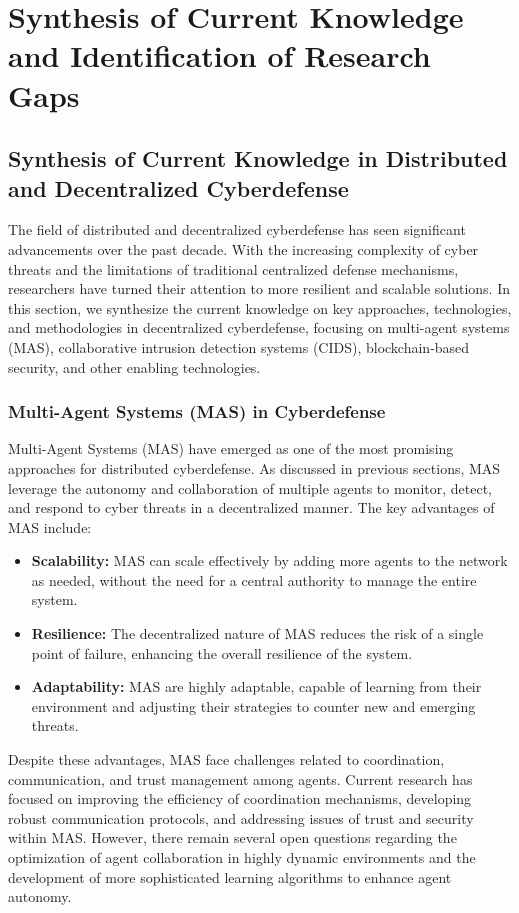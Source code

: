 \section{Synthesis of Current Knowledge and Identification of Research Gaps}

\subsection{Synthesis of Current Knowledge in Distributed and Decentralized Cyberdefense}

The field of distributed and decentralized cyberdefense has seen significant advancements over the past decade. With the increasing complexity of cyber threats and the limitations of traditional centralized defense mechanisms, researchers have turned their attention to more resilient and scalable solutions. In this section, we synthesize the current knowledge on key approaches, technologies, and methodologies in decentralized cyberdefense, focusing on multi-agent systems (MAS), collaborative intrusion detection systems (CIDS), blockchain-based security, and other enabling technologies.

\subsubsection{Multi-Agent Systems (MAS) in Cyberdefense}

Multi-Agent Systems (MAS) have emerged as one of the most promising approaches for distributed cyberdefense. As discussed in previous sections, MAS leverage the autonomy and collaboration of multiple agents to monitor, detect, and respond to cyber threats in a decentralized manner. The key advantages of MAS include:

\begin{itemize}
    \item \textbf{Scalability:} MAS can scale effectively by adding more agents to the network as needed, without the need for a central authority to manage the entire system.
    \item \textbf{Resilience:} The decentralized nature of MAS reduces the risk of a single point of failure, enhancing the overall resilience of the system.
    \item \textbf{Adaptability:} MAS are highly adaptable, capable of learning from their environment and adjusting their strategies to counter new and emerging threats.
\end{itemize}

Despite these advantages, MAS face challenges related to coordination, communication, and trust management among agents. Current research has focused on improving the efficiency of coordination mechanisms, developing robust communication protocols, and addressing issues of trust and security within MAS. However, there remain several open questions regarding the optimization of agent collaboration in highly dynamic environments and the development of more sophisticated learning algorithms to enhance agent autonomy.


